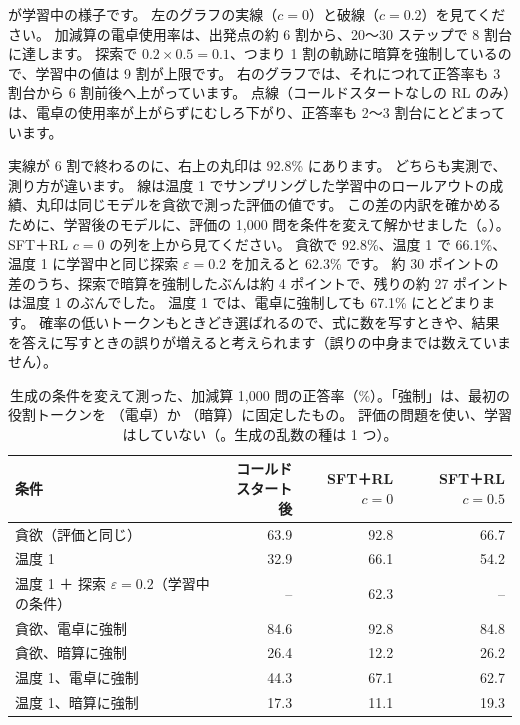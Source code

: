 が学習中の様子です。
左のグラフの実線（$c=0$）と破線（$c=0.2$）を見てください。
加減算の電卓使用率は、出発点の約 6 割から、20〜30 ステップで 8 割台に達します。
探索で $0.2\times0.5=0.1$、つまり 1 割の軌跡に暗算を強制しているので、学習中の値は 9 割が上限です。
右のグラフでは、それにつれて正答率も 3 割台から 6 割前後へ上がっています。
点線（コールドスタートなしの RL のみ）は、電卓の使用率が上がらずにむしろ下がり、正答率も 2〜3 割台にとどまっています。

実線が 6 割で終わるのに、右上の丸印は 92.8\% にあります。
どちらも実測で、測り方が違います。
線は温度 1 でサンプリングした学習中のロールアウトの成績、丸印は同じモデルを貪欲で測った評価の値です。
この差の内訳を確かめるために、学習後のモデルに、評価の 1,000 問を条件を変えて解かせました（。）。
SFT＋RL $c=0$ の列を上から見てください。
貪欲で 92.8\%、温度 1 で 66.1\%、温度 1 に学習中と同じ探索 $\varepsilon=0.2$ を加えると 62.3\% です。
約 30 ポイントの差のうち、探索で暗算を強制したぶんは約 4 ポイントで、残りの約 27 ポイントは温度 1 のぶんでした。
温度 1 では、電卓に強制しても 67.1\% にとどまります。
確率の低いトークンもときどき選ばれるので、式に数を写すときや、結果を答えに写すときの誤りが増えると考えられます（誤りの中身までは数えていません）。

\begin{table}[tbp]
\centering
\caption{生成の条件を変えて測った、加減算 1,000 問の正答率（\%）。「強制」は、最初の役割トークンを （電卓）か （暗算）に固定したもの。
評価の問題を使い、学習はしていない（。生成の乱数の種は 1 つ）。}
\label{tab:arl-temp}
\small
\begin{tabular}{lrrr}
\toprule
条件 & \shortstack[r]{コールド\\スタート後} & \shortstack[r]{SFT＋RL\\$c=0$} & \shortstack[r]{SFT＋RL\\$c=0.5$} \\
\midrule
貪欲（評価と同じ） & 63.9 & 92.8 & 66.7 \\
温度 1 & 32.9 & 66.1 & 54.2 \\
温度 1 ＋ 探索 $\varepsilon=0.2$（学習中の条件） & -- & 62.3 & -- \\
\midrule
貪欲、電卓に強制 & 84.6 & 92.8 & 84.8 \\
貪欲、暗算に強制 & 26.4 & 12.2 & 26.2 \\
温度 1、電卓に強制 & 44.3 & 67.1 & 62.7 \\
温度 1、暗算に強制 & 17.3 & 11.1 & 19.3 \\
\bottomrule
\end{tabular}
\end{table}

